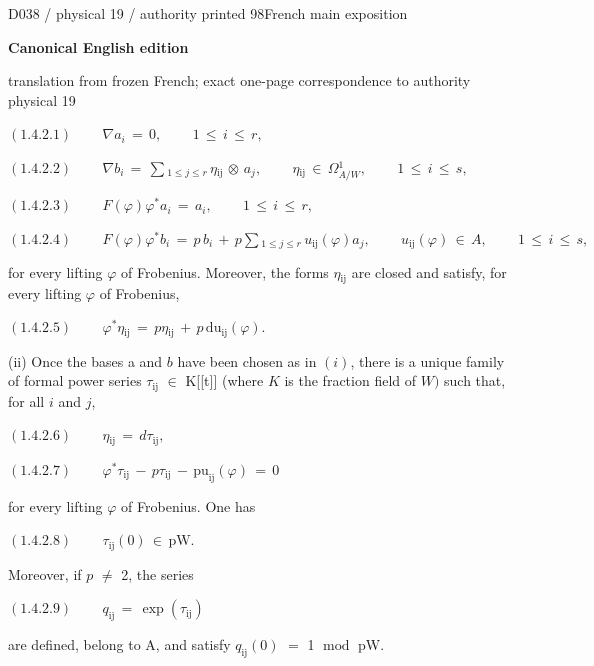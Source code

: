 \documentclass[9pt]{article}
\newcommand{\CanonText}[1]{\par{\fontsize{8.0}{9.35}\selectfont\RaggedRight #1\par}\vspace{2.2pt}}
\newcommand{\CanonDisplay}[1]{\par\vspace{1.2pt}\begin{center}{\fontsize{7.2}{8.4}\selectfont\(\displaystyle #1\)}\end{center}\vspace{1.2pt}}
\newcommand{\LayerTitle}{Canonical English edition}
\begin{document}
\noindent\begin{minipage}[t][\dimexpr\textheight-5pt\relax][t]{\textwidth}
{\sffamily\fontsize{7.3}{8.2}\selectfont\color{Quiet} D038 / physical 19 / authority printed 98\hfill French main exposition}
\par{}\vspace{4.5pt}
{\sffamily\fontsize{10.4}{11.6}\selectfont\bfseries\color{Accent} \LayerTitle}
\par{\sffamily\fontsize{6.7}{7.7}\selectfont\color{Quiet} translation from frozen French; exact one-page correspondence to authority physical 19}
\vspace{5pt}
\CanonDisplay{(1.4.2.1)\qquad\,\nabla{}a_{i}\,=\,0,\qquad\,1\,\leq{}\,i\,\leq{}\,r,}
\CanonDisplay{(1.4.2.2)\qquad\,\nabla{}b_{i}\,=\,\sum{}_{1\leq{}j\leq{}r}\,\eta{}_{\mathrm{ij}}\,\otimes{}\,a_{j},\qquad\,\eta{}_{\mathrm{ij}}\,\in{}\,\Omega{}^{1}_{A/W},\qquad\,1\,\leq{}\,i\,\leq{}\,s,}
\CanonDisplay{(1.4.2.3)\qquad\,F(\varphi{})\varphi{}^{*}a_{i}\,=\,a_{i},\qquad\,1\,\leq{}\,i\,\leq{}\,r,}
\CanonDisplay{(1.4.2.4)\qquad\,F(\varphi{})\varphi{}^{*}b_{i}\,=\,p\,b_{i}\,+\,p\sum{}_{1\leq{}j\leq{}r}\,u_{\mathrm{ij}}(\varphi{})a_{j},\qquad\,u_{\mathrm{ij}}(\varphi{})\,\in{}\,A,\qquad\,1\,\leq{}\,i\,\leq{}\,s,}
\CanonText{for every lifting \(\varphi{}\) of Frobenius. Moreover, the forms \(\eta{}_{\mathrm{ij}}\) are closed and satisfy, for every lifting \(\varphi{}\) of Frobenius,}
\CanonDisplay{(1.4.2.5)\qquad\,\varphi{}^{*}\eta{}_{\mathrm{ij}}\,=\,p\eta{}_{\mathrm{ij}}\,+\,p\,\text{du}_{\mathrm{ij}}(\varphi{}).}
\CanonText{(ii) Once the bases a and \(b\) have been chosen as in \((i)\), there is a unique family of formal power series \(\tau{}_{\mathrm{ij}}\) \(\in{}\) K[[t]] (where \(K\) is the fraction field of \(W)\) such that, for all \(i\) and \(j\),}
\CanonDisplay{(1.4.2.6)\qquad\,\eta{}_{\mathrm{ij}}\,=\,d\tau{}_{\mathrm{ij}},}
\CanonDisplay{(1.4.2.7)\qquad\,\varphi{}^{*}\tau{}_{\mathrm{ij}}\,-\,p\tau{}_{\mathrm{ij}}\,-\,\text{pu}_{\mathrm{ij}}(\varphi{})\,=\,0}
\CanonText{for every lifting \(\varphi{}\) of Frobenius. One has}
\CanonDisplay{(1.4.2.8)\qquad\,\tau{}_{\mathrm{ij}}(0)\,\in{}\,\text{pW}.}
\CanonText{Moreover, if \(p\) \(\neq{}\) 2, the series}
\CanonDisplay{(1.4.2.9)\qquad\,q_{\mathrm{ij}}\,=\,\operatorname{exp}(\tau{}_{\mathrm{ij}})}
\CanonText{are defined, belong to A, and satisfy \(q_{\mathrm{ij}}(0)\) \(=\) 1 \(\operatorname{mod}\) pW.}

\end{minipage}
\end{document}
